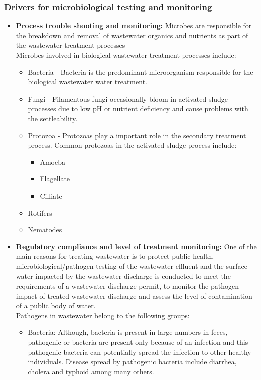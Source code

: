 			\subsubsection{Drivers for microbiological testing and monitoring}
			\begin{itemize}
			\item \textbf{Process trouble shooting and monitoring:}  Microbes are responsible for the breakdown and removal of wastewater organics and nutrients as part of the wastewater treatment processes\\
							Microbes involved in biological wastewater treatment processes include:\\
				\begin{itemize}
					\item Bacteria - Bacteria is the predominant microorganism responsible for the biological wastewater water treatment.  
					\item Fungi - Filamentous fungi occasionally bloom in activated sludge processes due to low pH or nutrient deficiency and cause problems with the settleability.
					\item Protozoa - Protozoas play a important role in the secondary treatment process.  Common protozoas in the activated sludge process include:
					      \begin{itemize}
					      	\item Amoeba
					      	\item Flagellate
					      	\item Cilliate
					      \end{itemize}
					\item Rotifers
					\item Nematodes
					\end{itemize}
			\item \textbf{Regulatory compliance and level of treatment monitoring:}  One of the main reasons for treating wastewater is to protect public health, microbiological/pathogen testing of the wastewater effluent and the surface water impacted by the wastewater discharge is conducted to meet the requirements of a wastewater discharge permit, to monitor the pathogen impact of treated wastewater discharge and assess the level of contamination of a public body of water.\\
	
							Pathogens in wastewater belong to the following groups:
				\begin{itemize}
					\item Bacteria:  Although, bacteria is present in large numbers in feces, pathogenic or bacteria are present only because of an infection and this pathogenic bacteria can potentially spread the infection to other healthy individuals.  Disease spread by pathogenic bacteria include diarrhea, cholera and typhoid among many others.
					      

\end{itemize}
\end{itemize}
